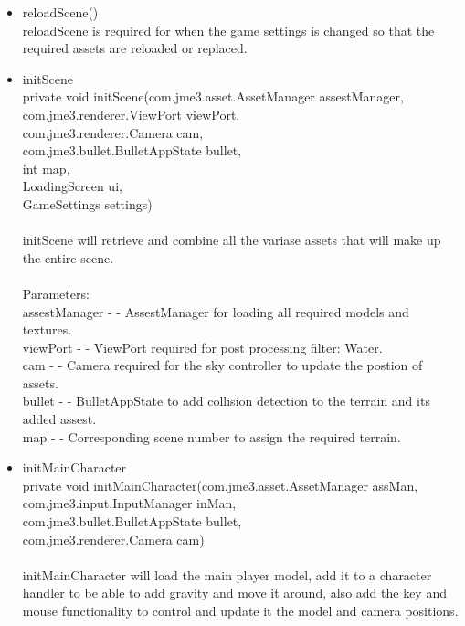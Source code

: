 \documentclass[letterpaper]{article}
\begin{document}
\begin{itemize}
\begin{itemize}
											\item	reloadScene() \\
													reloadScene is required for when the game settings is changed so that the required assets are reloaded or replaced. \\
											\item	initScene \\
													private void initScene(com.jme3.asset.AssetManager assestManager, \\
				             com.jme3.renderer.ViewPort viewPort, \\
				             com.jme3.renderer.Camera cam, \\
				             com.jme3.bullet.BulletAppState bullet, \\
				             int map, \\
				             LoadingScreen ui, \\
				             GameSettings settings) \\ \\
													initScene will retrieve and combine all the variase assets that will make up the entire scene. \\ \\
													Parameters: \\
													assestManager - - AssestManager for loading all required models and textures. \\
													viewPort - - ViewPort required for post processing filter: Water. \\
													cam - - Camera required for the sky controller to update the postion of assets. \\
													bullet - - BulletAppState to add collision detection to the terrain and its added assest. \\
													map - - Corresponding scene number to assign the required terrain. \\
											\item	initMainCharacter \\
													private void initMainCharacter(com.jme3.asset.AssetManager assMan, \\
				                     com.jme3.input.InputManager inMan, \\
				                     com.jme3.bullet.BulletAppState bullet, \\
				                     com.jme3.renderer.Camera cam) \\ \\
													initMainCharacter will load the main player model, add it to a character handler to be able to add gravity and move it around, also add the key and mouse functionality to control and update it the model and camera positions. \\ \\

\end{itemize}
\end{itemize}
\end{document}
